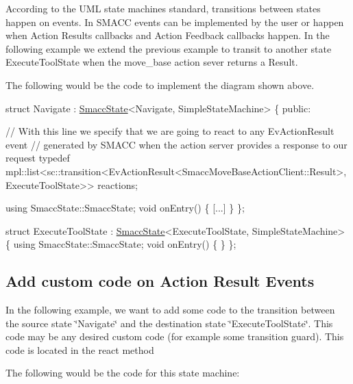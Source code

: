 According to the U\+ML state machines standard, transitions between states happen on events. In S\+M\+A\+CC events can be implemented by the user or happen when Action Results callbacks and Action Feedback callbacks happen. In the following example we extend the previous example to transit to another state \textquotesingle{}Execute\+Tool\+State\textquotesingle{} when the move\+\_\+base action sever returns a Result.

 

The following would be the code to implement the diagram shown above.


\begin{DoxyCode}
\textcolor{keyword}{struct }Navigate : \hyperlink{classSmaccState}{SmaccState}<Navigate, SimpleStateMachine>
\{
\textcolor{keyword}{public}:

  \textcolor{comment}{// With this line we specify that we are going to react to any EvActionResult event}
  \textcolor{comment}{// generated by SMACC when the action server provides a response to our request}
  \textcolor{keyword}{typedef} mpl::list<sc::transition<EvActionResult<SmaccMoveBaseActionClient::Result>, ExecuteToolState>> 
      reactions;

  \textcolor{keyword}{using} SmaccState::SmaccState;
  \textcolor{keywordtype}{void} onEntry()
  \{
   [...]
  \}
\};

\textcolor{keyword}{struct }ExecuteToolState : \hyperlink{classSmaccState}{SmaccState}<ExecuteToolState, SimpleStateMachine>
\{
    \textcolor{keyword}{using} SmaccState::SmaccState;
    \textcolor{keywordtype}{void} onEntry()
    \{
    \}
\};
\end{DoxyCode}


\subsection*{Add custom code on Action Result Events}

In the following example, we want to add some code to the transition between the source state \char`\"{}\+Navigate\char`\"{} and the destination state \char`\"{}\+Execute\+Tool\+State\char`\"{}. This code may be any desired custom code (for example some transition guard). This code is located in the react method

 

The following would be the code for this state machine\+:


